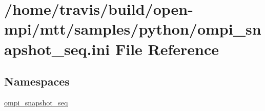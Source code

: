 \hypertarget{ompi__snapshot__seq_8ini}{\section{/home/travis/build/open-\/mpi/mtt/samples/python/ompi\-\_\-snapshot\-\_\-seq.ini File Reference}
\label{ompi__snapshot__seq_8ini}
}
\subsection*{Namespaces}
\begin{DoxyCompactItemize}
\item 
\hyperlink{namespaceompi__snapshot__seq}{ompi\-\_\-snapshot\-\_\-seq}
\end{DoxyCompactItemize}
